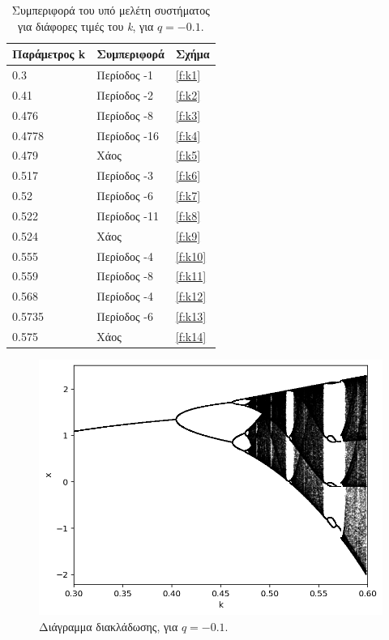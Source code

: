 \begin{table}[h!]
	\centering
	\caption{ Συμπεριφορά του υπό μελέτη συστήματος για διάφορες τιμές του \emph{k}, για $q=-0.1$.}
	\begin{tabular}{l | l | l}
		Παράμετρος k & Συμπεριφορά & Σχήμα\\
		\hline
		0.3 &  Περίοδος -1 & \ref{f:k1}\\
		0.41 & Περίοδος -2 & \ref{f:k2}\\
		0.476 &  Περίοδος -8 & \ref{f:k3}\\
		0.4778 & Περίοδος -16 & \ref{f:k4}\\
		0.479 & Χάος & \ref{f:k5}\\
		0.517 & Περίοδος -3 & \ref{f:k6}\\
		0.52 & Περίοδος -6 & \ref{f:k7}\\
		0.522 & Περίοδος -11 & \ref{f:k8}\\
		0.524 & Χάος & \ref{f:k9}\\
		0.555 & Περίοδος -4 & \ref{f:k10}\\
		0.559 & Περίοδος -8 & \ref{f:k11}\\
		0.568 & Περίοδος -4 & \ref{f:k12}\\
		0.5735 & Περίοδος -6 & \ref{f:k13}\\
		0.575 & Χάος & \ref{f:k14}\\
	\end{tabular}
	
	\label{tab:abc}
\end{table}


\begin{figure}[h!]
	\centering
	\includegraphics[width=0.8\linewidth]{LateX images/graphs/g1}
	\caption{ Διάγραμμα διακλάδωσης, για $q=-0.1$.}
	\label{f:g1}	
\end{figure}

